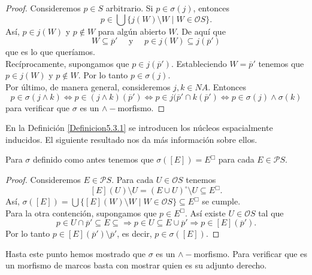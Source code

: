 \begin{proof}
    Consideremos $p\in S$ arbitrario. Si $p\in \sigma(j)$, entonces 
    \[
    p\in \bigcup\{j(W)\setminus W\mid W\in \mathcal{O}S\}.
    \]
    Así, $p\in j(W)$ y $p\notin W$ para algún abierto $W$. De aquí que 
    \[
    W\subseteq \overline{p}' \quad \mbox{ y }\quad p\in j(W)\subseteq j(\overline{p}')
    \]
    que es lo que queríamos.\\

    Recíprocamente, supongamos que $p\in j(\overline{p}')$. Estableciendo $W=\overline{p}'$ tenemos que $p\in j(W)$ y $p\notin W$. Por lo tanto $p\in \sigma(j)$.\\

    Por último, de manera general, consideremos $j, k\in NA$. Entonces
    \[
    p\in \sigma (j\wedge k)\Leftrightarrow p\in (j\wedge k)(\overline{p}')\Leftrightarrow p\in j(\overline{p}'\cap k(\overline{p}')\Leftrightarrow p\in \sigma(j)\wedge \sigma(k)
    \]
    para verificar que $\sigma$ es un $\wedge-$morfismo.
\end{proof}

En la Definición \ref{Definicion5.3.1} se introducen los núcleos espacialmente inducidos. El siguiente resultado nos da más información sobre ellos.

\begin{lem}\label{Lema6.3.4}
    Para $\sigma$ definido como antes tenemos que $\sigma([E])=E^\Box$ para cada $E\in \mathcal{P}S$.
\end{lem}

\begin{proof}
    Consideremos $E\in \mathcal{P}S$. Para cada $U\in \mathcal{O}S$ tenemos
    \[
    [E](U)\setminus U=(E\cup U)^\circ \setminus U\subseteq E^\Box.
    \]
    Así, $\sigma([E])=\bigcup\{[E](W)\setminus W\mid W\in \mathcal{O}S\}\subseteq E^\Box$ se cumple.\\

    Para la otra contención, supongamos que $p\in E^\Box$. Así existe $U\in \mathcal{O}S$ tal que
    \[
    p\in U\cap \overline{p}'\subseteq E\subseteq \Rightarrow p\in U\subseteq E\cup \overline{p}'\Rightarrow p\in [E](\overline{p}').
    \]
    Por lo tanto $p\in [E](\overline{p}')\setminus \overline{p}'$, es decir, $p\in \sigma([E])$.
\end{proof}

Hasta este punto hemos mostrado que $\sigma$ es un $\wedge-$morfismo. Para verificar que es un morfismo de marcos basta con mostrar quien es su adjunto derecho.


